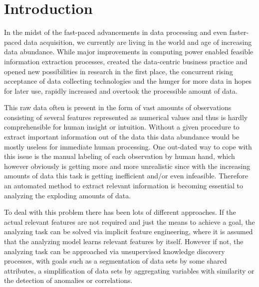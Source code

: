 \chapter{Introduction}\label{ch:intro}

In the midst of the fast-paced advancements in data processing and even faster-paced data acquisition, we currently are living in the world and age of increasing data abundance. While major improvements in computing power enabled feasible information extraction processes, created the data-centric business practice and opened new possibilities in research in the first place, the concurrent rising acceptance of data collecting technologies and the hunger for more data in hopes for later use, rapidly increased and overtook the processible amount of data. 

This raw data often is present in the form of vast amounts of observations consisting of several features represented as numerical values and thus is hardly comprehensible for human insight or intuition. Without a given procedure to extract important information out of the data this data abundance would be mostly useless for immediate human processing. One out-dated way to cope with this issue is the manual labeling of each observation by human hand, which however obviously is getting more and more unrealistic since with the increasing amounts of data this task is getting inefficient and/or even infeasible. Therefore an automated method to extract relevant information is becoming essential to analyzing the exploding amounts of data. %

To deal with this problem there has been lots of different approaches.
If the actual relevant features are not required and just the means to achieve a goal, the analyzing task can be solved via implicit feature engineering, where it is assumed that the analyzing model learns relevant features by itself.
However if not, the analyzing task can be approached via unsupervised knowledge discovery processes, with goals such as a segmentation of data sets by some shared attributes, a simplification of data sets by aggregating variables with similarity or the detection of anomalies or correlations.


